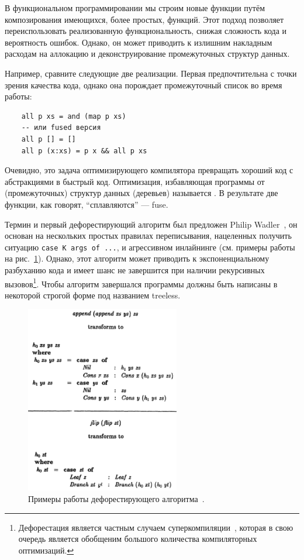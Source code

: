 В функциональном программировании мы строим новые функции путём композирования имеющихся, более простых, функций.
Этот подход позволяет переиспользовать реализованную функциональность, снижая сложность кода и вероятность ошибок.
Однако, он может приводить к излишним накладным расходам на аллокацию и деконструирование промежуточных структур данных.

Например, сравните следующие две реализации.
Первая предпочтительна с точки зрения качества кода, однако она порождает промежуточный список во время работы:
\begin{verbatim}
    all p xs = and (map p xs)
    -- или fused версия
    all p [] = []
    all p (x:xs) = p x && all p xs
\end{verbatim}

Очевидно, это задача оптимизирующего компилятора превращать хороший код с абстракциями в быстрый код.
Оптимизация, избавляющая программы от (промежуточных) структур данных (деревьев) называется .
В результате две функции, как говорят, ``сплавляются'' --- fuse.

Термин и первый дефорестирующий алгоритм был предложен Philip Wadler~\cite{wadler1988deforestation}, он основан на нескольких простых правилах переписывания, нацеленных получить ситуацию \texttt{case K args of ...}, и агрессивном инлайнинге (см. примеры работы на рис.~\ref{fig:deforestation-examples}).
Однако, этот алгоритм может приводить к экспоненциальному разбуханию кода и имеет шанс не завершится при наличии рекурсивных вызовов\footnote{Дефорестация является частным случаем суперкомпиляции~\cite{supercomp}, которая в свою очередь является обобщеним большого количества компиляторных оптимизаций.}.
Чтобы алгоритм завершался программы должны быть написаны в некоторой строгой форме под названием treeless.

\begin{figure}
    \centering
    \includegraphics[width=0.6\textwidth]{figs/deforestation-examples}
    \caption{Примеры работы дефорестирующего алгоритма~\cite{wadler1988deforestation}.}
    \label{fig:deforestation-examples}
\end{figure}

